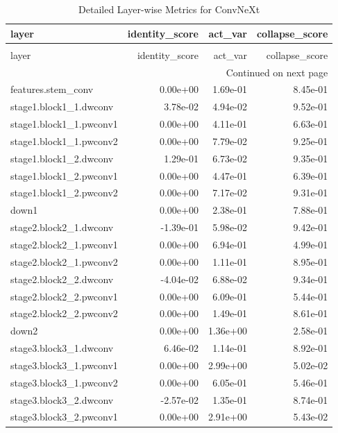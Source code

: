 \begin{longtable}{lrrr}
\caption{Detailed Layer-wise Metrics for ConvNeXt} \label{tab:layer_metrics_convnext} \\
\toprule
layer & identity_score & act_var & collapse_score \\
\midrule
\endfirsthead
\caption[]{Detailed Layer-wise Metrics for ConvNeXt} \\
\toprule
layer & identity_score & act_var & collapse_score \\
\midrule
\endhead
\midrule
\multicolumn{4}{r}{Continued on next page} \\
\midrule
\endfoot
\bottomrule
\endlastfoot
features.stem_conv & 0.00e+00 & 1.69e-01 & 8.45e-01 \\
stage1.block1_1.dwconv & 3.78e-02 & 4.94e-02 & 9.52e-01 \\
stage1.block1_1.pwconv1 & 0.00e+00 & 4.11e-01 & 6.63e-01 \\
stage1.block1_1.pwconv2 & 0.00e+00 & 7.79e-02 & 9.25e-01 \\
stage1.block1_2.dwconv & 1.29e-01 & 6.73e-02 & 9.35e-01 \\
stage1.block1_2.pwconv1 & 0.00e+00 & 4.47e-01 & 6.39e-01 \\
stage1.block1_2.pwconv2 & 0.00e+00 & 7.17e-02 & 9.31e-01 \\
down1 & 0.00e+00 & 2.38e-01 & 7.88e-01 \\
stage2.block2_1.dwconv & -1.39e-01 & 5.98e-02 & 9.42e-01 \\
stage2.block2_1.pwconv1 & 0.00e+00 & 6.94e-01 & 4.99e-01 \\
stage2.block2_1.pwconv2 & 0.00e+00 & 1.11e-01 & 8.95e-01 \\
stage2.block2_2.dwconv & -4.04e-02 & 6.88e-02 & 9.34e-01 \\
stage2.block2_2.pwconv1 & 0.00e+00 & 6.09e-01 & 5.44e-01 \\
stage2.block2_2.pwconv2 & 0.00e+00 & 1.49e-01 & 8.61e-01 \\
down2 & 0.00e+00 & 1.36e+00 & 2.58e-01 \\
stage3.block3_1.dwconv & 6.46e-02 & 1.14e-01 & 8.92e-01 \\
stage3.block3_1.pwconv1 & 0.00e+00 & 2.99e+00 & 5.02e-02 \\
stage3.block3_1.pwconv2 & 0.00e+00 & 6.05e-01 & 5.46e-01 \\
stage3.block3_2.dwconv & -2.57e-02 & 1.35e-01 & 8.74e-01 \\
stage3.block3_2.pwconv1 & 0.00e+00 & 2.91e+00 & 5.43e-02 \\

\end{longtable}

